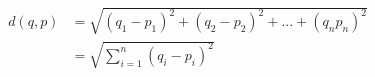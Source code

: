 \documentclass[preview]{standalone}
\begin{document}
\begin{align*}
d(q,p) &= \sqrt{(q_1-p_1)^2+(q_2-p_2)^2+...+(q_n p_n)^2}\\ &=\sqrt{\sum_{i=1}^n \left(q_i-p_i \right)^2}
\end{align*}
\end{document}
